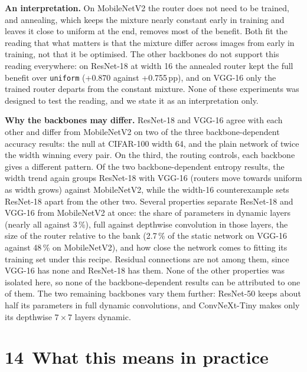 \documentclass{article}
\begin{document}
\textbf{An interpretation.}  On MobileNetV2 the router does not need to
be trained, and annealing, which keeps the mixture nearly constant early in
training and leaves it close to uniform at the end, removes most of the
benefit. Both fit the reading that what matters is that the mixture differ
across images from early in training, not that it be optimised. The other
backbones do not support this reading everywhere: on ResNet-18 at width 16
the annealed router kept the full benefit over \texttt{uniform}
(+0.870 against +0.755\,pp), and on VGG-16 only the trained router
departs from the constant mixture. None of these experiments was designed
to test the reading, and we state it as an interpretation only.

\textbf{Why the backbones may differ.}  ResNet-18 and VGG-16 agree with
each other and differ from MobileNetV2 on two of the three
backbone-dependent accuracy results: the null at CIFAR-100 width 64, and
the plain network of twice the width winning every pair. On the third, the
routing controls, each backbone gives a different pattern. Of the two
backbone-dependent entropy results, the width trend again groups ResNet-18
with VGG-16 (routers move towards uniform as width grows) against
MobileNetV2, while the width-16 counterexample sets ResNet-18 apart from
the other two. Several
properties separate ResNet-18 and VGG-16 from MobileNetV2 at once: the share of parameters in dynamic layers (nearly all
against 3\,\%), full against depthwise convolution in those
layers, the size of the router relative to the bank (2.7\,\% of
the static network on VGG-16 against 48\,\% on MobileNetV2),
and how close the network comes to fitting its training set under this
recipe. Residual connections are not among them, since VGG-16 has none and
ResNet-18 has them. None of the other properties was isolated here, so
none of the backbone-dependent results can be attributed to one of them.
The two remaining backbones vary them further: ResNet-50 keeps about half
its parameters in full dynamic convolutions, and ConvNeXt-Tiny makes only
its depthwise $7\times7$ layers dynamic.

\section*{14 What this means in practice}
\end{document}

